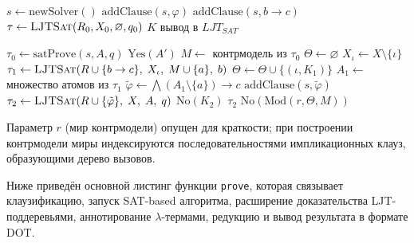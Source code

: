 \documentclass[14pt, russian]{scrartcl}
\begin{document}
\begin{listing}[!htb]
\caption{Главная процедура $LJT_{SAT}$}
\label{alg:ljtsat-main}
\begin{algorithmic}[1]
  \State $s \gets \mathrm{newSolver}()$
    \State $\mathrm{addClause}(s, \varphi)$
  \EndFor
    \State $\mathrm{addClause}(s, b \to c)$
  \EndFor
  \State $\tau \gets \Call{LJTSat}{R_0, X_0, \varnothing, q_0}$
    \State \Return $K$
  \Else
    \State \Return вывод в $LJT_{SAT}$
  \EndIf
\EndFunction
\end{algorithmic}
\end{listing}

\begin{listing}[!htb]
\caption{Рекурсивная процедура поиска вывода}
\label{alg:ljtsat}
\begin{algorithmic}[1]
  \State $\tau_0 \gets \mathrm{satProve}(s, A, q)$
    \State \Return $\mathrm{Yes}(A')$
  \EndIf
  \State $M \gets$ контрмодель из $\tau_0$
  \State $\Theta \gets \varnothing$
    \State $X_\iota \gets X \setminus \{\iota\}$
    \State $\tau_1 \gets \Call{LJTSat}{R \cup \{b \to c\},\;
      X_\iota,\; M \cup \{a\},\; b}$
      \State $\Theta \gets \Theta \cup \{(\iota, K_1)\}$
    \Else
      \State $A_1 \gets$ множество атомов из $\tau_1$
      \State $\tilde{\varphi} \gets
        \bigwedge(A_1 \setminus \{a\}) \to c$
      \State $\mathrm{addClause}(s, \tilde{\varphi})$
      \State $\tau_2 \gets \Call{LJTSat}{R \cup \{\tilde{\varphi}\},\;
        X,\; A,\; q}$
        \State \Return $\mathrm{No}(K_2)$
      \Else
        \State \Return $\tau_2$
      \EndIf
    \EndIf
  \EndFor
  \State \Return $\mathrm{No}(\mathrm{Mod}(r, \Theta, M))$
\EndFunction
\end{algorithmic}
\end{listing}

Параметр $r$ (мир контрмодели) опущен для краткости; при построении контрмодели
миры индексируются последовательностями импликационных клауз, образующими дерево
вызовов.

\anonappendix
\label{app:prove}

Ниже приведён основной листинг функции \texttt{prove}, которая связывает
клаузификацию, запуск SAT-based алгоритма, расширение доказательства
LJT-поддеревьями, аннотирование $\lambda$-термами, редукцию и вывод
результата в формате DOT.
\end{document}

